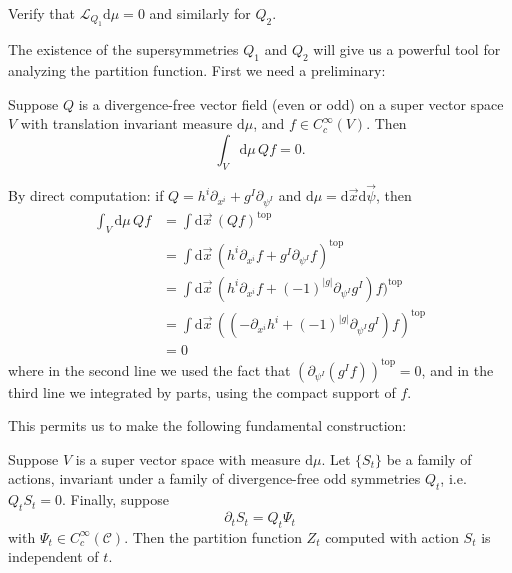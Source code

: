 \documentclass[12pt,letterpaper,reqno]{article}
\numberwithin{equation}{section}
\newcommand{\cC}{\ensuremath{\mathcal C}}
\newcommand{\cL}{\ensuremath{\mathcal L}}
\newcommand{\de}{\mathrm{d}}
\newcommand{\rmtop}{\mathrm{top}}
\newcommand{\abs}[1]{\lvert#1\rvert}
\newcommand{\IP}[1]{\langle#1\rangle}
\begin{document}
\begin{exercise} Verify that $\cL_{Q_1} \de \mu = 0$ and similarly
for $Q_2$.
\end{exercise}

The existence of the supersymmetries $Q_1$ and $Q_2$ will give us a 
powerful tool for analyzing the partition function.
First we need a preliminary:

\begin{lem} Suppose $Q$ is a divergence-free vector field
(even or odd)
on a super vector space $V$ with translation invariant measure $\de \mu$, 
and $f \in C^\infty_c(V)$. Then
\begin{equation}
  \int_V \de \mu \, Qf = 0.
\end{equation}
\end{lem}

\begin{pf} By direct computation: if $Q = h^i \partial_{x^i} + g^I \partial_{\psi^I}$ and $\de \mu = \de \vec{x} \de \vec{\psi}$, then
\begin{align}
  \int_V \de \mu \, Qf &= \int \de \vec{x} \, (Qf)^\rmtop \\
  &= \int \de \vec{x} \, (h^i \partial_{x^i} f + g^I \partial_{\psi^I} f)^\rmtop \\
  &= \int \de \vec{x} \, (h^i \partial_{x^i} f + (-1)^{\abs{g}} \partial_{\psi^I} g^I) f)^\rmtop \\
  &= \int \de \vec{x} \, ((- \partial_{x^i} h^i + (-1)^{\abs{g}} \partial_{\psi^I} g^I) f)^\rmtop \\
  &= 0 
\end{align}
where in the second line we used the fact that $(\partial_{\psi^I} (g^I f))^\rmtop = 0$, and in the third line we integrated by parts, 
using the compact support of $f$.
\end{pf}

This permits us to make the following fundamental construction:
\begin{prop} \label{prop:Z-deformation-invariance}
Suppose $V$ is a super vector space with measure $\de \mu$.
Let $\{S_t\}$ be a family of actions,
invariant under a family of divergence-free odd symmetries $Q_t$,
i.e. $Q_t S_t = 0$.
Finally, suppose
\begin{equation}
  \partial_t S_t = Q_t \Psi_t
\end{equation}
with $\Psi_t \in C^\infty_c(\cC)$. 
Then the partition function $Z_t$ computed with action $S_t$
is independent of $t$.
\end{prop}
\end{document}
